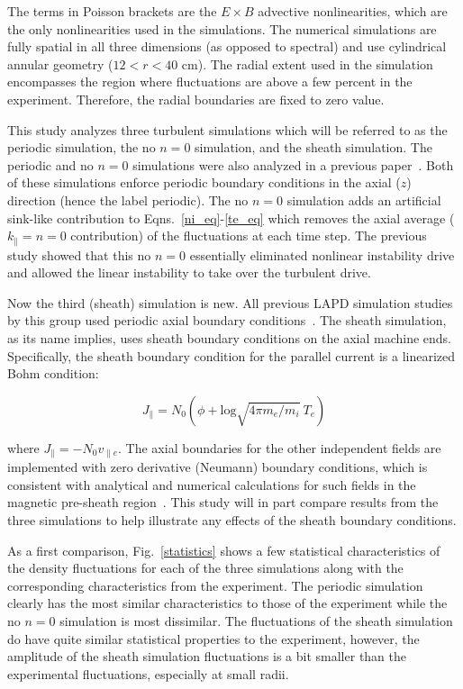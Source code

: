 \documentclass[showpacs,preprintnumbers,amsmath,amssymb,superscriptaddress,aip]{revtex4-1}
\def\beq{\begin{equation}}
\def\eeq{\end{equation}}
\def\para{\parallel}
\newcommand{\vpe}{v_{\parallel e}}
\begin{document}
The terms in Poisson brackets are the $E \times B$ advective nonlinearities, which are the only nonlinearities used in the simulations.
The numerical simulations are fully spatial in all three dimensions (as opposed to spectral) and use cylindrical annular geometry ($12<r<40$ cm). The radial extent used in the simulation
encompasses the region where fluctuations are above a few percent in the experiment. Therefore, the radial boundaries are fixed to zero value.

This study analyzes three turbulent simulations which will be referred to as the periodic simulation, the no $n=0$ simulation, and the sheath simulation.
The periodic and no $n=0$ simulations were also analyzed in a previous paper~\cite{friedman2012b}. Both of these simulations enforce periodic boundary conditions in the axial ($z$)
direction (hence the label periodic). The no $n=0$ simulation adds an artificial sink-like contribution to Eqns.~\ref{ni_eq}-\ref{te_eq} which removes the axial average 
($k_\parallel = n = 0$ contribution) of the fluctuations at each time step. The previous study showed that this no $n=0$ essentially eliminated nonlinear instability drive and allowed
the linear instability to take over the turbulent drive.

Now the third (sheath) simulation is new. 
All previous LAPD simulation studies by this group used periodic axial boundary conditions~\cite{Popovich2010a,Popovich2010b,Umansky2011,friedman2012,friedman2012b}.
The sheath simulation, as its name implies, uses sheath boundary conditions on the axial machine ends. Specifically, the sheath boundary
condition for the parallel current is a linearized Bohm condition:

\beq
\label{sheath_bndry}
J_\para = N_0 (\phi + \text{log} \sqrt{4 \pi m_e/m_i} \ T_e) 
\eeq

where $J_\para = - N_0 \vpe$. The axial boundaries for the other independent fields are implemented with zero derivative (Neumann) boundary conditions, which is consistent with
analytical and numerical calculations for such fields in the magnetic pre-sheath region~\cite{loizu2012}. 
This study will in part compare results from the three simulations to help illustrate any effects of the sheath boundary conditions.

As a first comparison, Fig.~\ref{statistics} shows a few statistical characteristics of the density fluctuations for each of the three simulations along with the corresponding
characteristics from the experiment. The periodic simulation clearly has the most similar characteristics to those of the experiment while the no $n=0$ simulation is most dissimilar.
The fluctuations of the sheath simulation do have quite similar statistical properties to the experiment, however, the amplitude of the sheath simulation fluctuations is a bit smaller
than the experimental fluctuations, especially at small radii.
\end{document}
